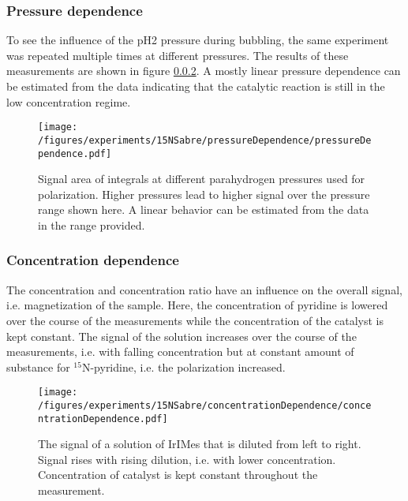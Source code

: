     \subsubsection{Pressure dependence}
        To see the influence of the pH2 pressure during bubbling, the same experiment was repeated multiple times at different pressures. The results of these measurements are shown in figure \ref{}. A mostly linear pressure dependence can be estimated from the data indicating that the catalytic reaction is still in the low concentration regime.
        \begin{figure}
            \label{fig:results:15N:pressureDependence}
            \texttt{[image: /figures/experiments/15NSabre/pressureDependence/pressureDependence.pdf]}
            \caption[Pressure dependence]{Signal area of integrals at different parahydrogen pressures used for polarization. Higher pressures lead to higher signal over the pressure range shown here. A linear behavior can be estimated from the data in the range provided.}
        \end{figure}
    \subsubsection{Concentration dependence}
        The concentration and concentration ratio have an influence on the overall signal, i.e. magnetization of the sample. Here, the concentration of pyridine is lowered over the course of the measurements while the concentration of the catalyst is kept constant. The signal of the solution increases over the course of the measurements, i.e. with falling concentration but at constant amount of substance for $^{15}$N-pyridine, i.e. the polarization increased.
        \begin{figure}
            \label{fig:results:15N:concentrationDependence}
            \texttt{[image: /figures/experiments/15NSabre/concentrationDependence/concentrationDependence.pdf]}
            \caption[Concentration dependence]{The signal of a solution of IrIMes that is diluted from left to right. Signal rises with rising dilution, i.e. with lower concentration. Concentration of catalyst is kept constant throughout the measurement.}
        \end{figure}
